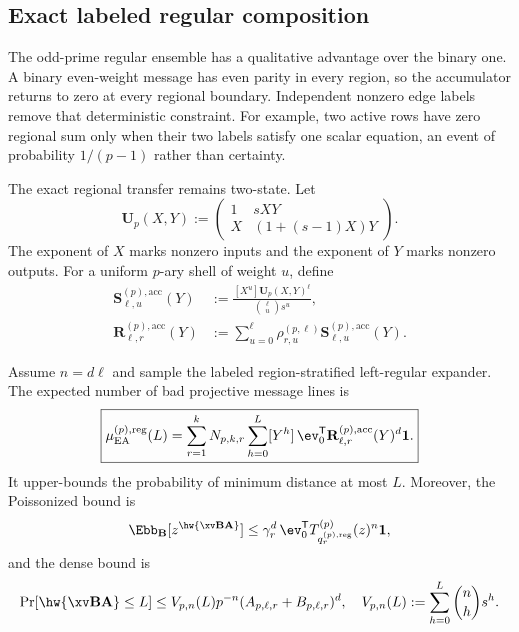 \subsection{Exact labeled regular composition}

The odd-prime regular ensemble has a qualitative advantage over the binary
one.  A binary even-weight message has even parity in every region, so the
accumulator returns to zero at every regional boundary.  Independent nonzero
edge labels remove that deterministic constraint.  For example, two active
rows have zero regional sum only when their two labels satisfy one scalar
equation, an event of probability $1/(p-1)$ rather than certainty.

The exact regional transfer remains two-state.  Let
\begin{equation}
 \mathbf U_p(X,Y):=
 \begin{pmatrix}
  1&sXY\\
  X&(1+(s-1)X)Y
 \end{pmatrix}.
 \label{eq:prime-ea-regular-bivariate-matrix}
\end{equation}
The exponent of $X$ marks nonzero inputs and the exponent of $Y$ marks
nonzero outputs.  For a uniform $p$-ary shell of weight $u$, define
\begin{align}
 \mathbf S^{(p),\mathrm{acc}}_{\ell,u}(Y)
 &:=\frac{[X^u]\mathbf U_p(X,Y)^\ell}
          {\binom{\ell}{u}s^u},
 \label{eq:prime-ea-regular-slice-matrix}\\
 \mathbf R^{(p),\mathrm{acc}}_{\ell,r}(Y)
 &:=\sum_{u=0}^\ell \rho^{(p,\ell)}_{r,u}
       \mathbf S^{(p),\mathrm{acc}}_{\ell,u}(Y).
 \label{eq:prime-ea-regular-region-matrix}
\end{align}

\begin{theorem}
\label{thm:prime-ea-regular-first-moment}
Assume $n=d\ell$ and sample the labeled region-stratified left-regular
expander.  The expected number of bad projective message lines is
\begin{equation}
 \boxed{
 \mu^{(p),\mathrm{reg}}_{\mathrm{EA}}(L)
 =\sum_{r=1}^k N_{p,k,r}\sum_{h=0}^L[Y^h]\,
   \ev_0^{\mathsf T}
   \mathbf R^{(p),\mathrm{acc}}_{\ell,r}(Y)^d\boldsymbol 1.
 }
 \label{eq:prime-ea-regular-first-moment}
\end{equation}
It upper-bounds the probability of minimum distance at most $L$.
Moreover, the Poissonized bound is
\begin{equation}
 \Ebb_{\B}[z^{\hw{\xv\B\A}}]
 \leq\gamma_r^d\,
 \ev_0^{\mathsf T}
 T^{(p)}_{q^{(p),\mathrm{reg}}_r}(z)^n\boldsymbol 1,
 \label{eq:prime-ea-regular-poisson-mgf}
\end{equation}
and the dense bound is
\begin{equation}
 \Pr[\hw{\xv\B\A}\leq L]
 \leq V_{p,n}(L)p^{-n}
       (A_{p,\ell,r}+B_{p,\ell,r})^d,
 \quad
 V_{p,n}(L):=\sum_{h=0}^L\binom nhs^h.
 \label{eq:prime-ea-regular-dense-bound}
\end{equation}
\end{theorem}

